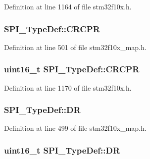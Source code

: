 Definition at line 1164 of file stm32f10x.\+h.

\subsubsection[{\texorpdfstring{C\+R\+C\+PR}{CRCPR}}]{ S\+P\+I\+\_\+\+Type\+Def\+::\+C\+R\+C\+PR}\hypertarget{struct_s_p_i___type_def_a612f57d523246444c9d21fa5053f68b7}{}\label{struct_s_p_i___type_def_a612f57d523246444c9d21fa5053f68b7}


Definition at line 501 of file stm32f10x\+\_\+map.\+h.

\subsubsection[{\texorpdfstring{C\+R\+C\+PR}{CRCPR}}]{ {\bf uint16\+\_\+t} S\+P\+I\+\_\+\+Type\+Def\+::\+C\+R\+C\+PR}\hypertarget{struct_s_p_i___type_def_a353c64e49ec9ae93b950668941f41175}{}\label{struct_s_p_i___type_def_a353c64e49ec9ae93b950668941f41175}


Definition at line 1170 of file stm32f10x.\+h.

\subsubsection[{\texorpdfstring{DR}{DR}}]{ S\+P\+I\+\_\+\+Type\+Def\+::\+DR}\hypertarget{struct_s_p_i___type_def_ac2c753a044e887e24a99decc1fdec142}{}\label{struct_s_p_i___type_def_ac2c753a044e887e24a99decc1fdec142}


Definition at line 499 of file stm32f10x\+\_\+map.\+h.

\subsubsection[{\texorpdfstring{DR}{DR}}]{ {\bf uint16\+\_\+t} S\+P\+I\+\_\+\+Type\+Def\+::\+DR}\hypertarget{struct_s_p_i___type_def_ae192c943732b6ab5e5611e860cc05544}{}\label{struct_s_p_i___type_def_ae192c943732b6ab5e5611e860cc05544}



